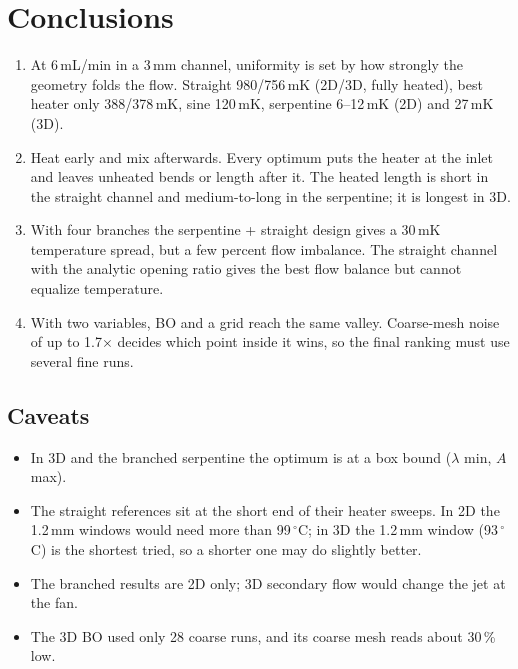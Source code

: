\documentclass[11pt,a4paper]{article}
\newcommand{\mK}{\ensuremath{\,\mathrm{mK}}}
\newcommand{\mm}{\ensuremath{\,\mathrm{mm}}}
\begin{document}
\section{Conclusions}
\begin{enumerate}
  \item At 6\,mL/min in a 3\mm{} channel, uniformity is set by how strongly the geometry folds the
        flow. Straight 980/756\mK{} (2D/3D, fully heated), best heater only 388/378\mK, sine
        120\mK, serpentine 6--12\mK{} (2D) and 27\mK{} (3D).
  \item Heat early and mix afterwards. Every optimum puts the heater at the inlet and leaves unheated
        bends or length after it. The heated length is short in the straight channel and
        medium-to-long in the serpentine; it is longest in 3D.
  \item With four branches the serpentine + straight design gives a 30\mK{} temperature spread,
        but a few percent flow imbalance. The straight channel with the analytic opening ratio gives
        the best flow balance but cannot equalize temperature.
  \item With two variables, BO and a grid reach the same valley. Coarse-mesh noise of up to
        1.7$\times$ decides which point inside it wins, so the final ranking must use several fine runs.
\end{enumerate}

\subsection*{Caveats}
\begin{itemize}
  \item In 3D and the branched serpentine the optimum is at a box bound ($\lambda$ min, $A$ max).
  \item The straight references sit at the short end of their heater sweeps. In 2D the 1.2\mm{}
        windows would need more than 99\,$^\circ$C; in 3D the 1.2\mm{} window (93\,$^\circ$C) is the
        shortest tried, so a shorter one may do slightly better.
  \item The branched results are 2D only; 3D secondary flow would change the jet at the fan.
  \item The 3D BO used only 28 coarse runs, and its coarse mesh reads about 30\,\% low.
\end{itemize}
\end{document}

